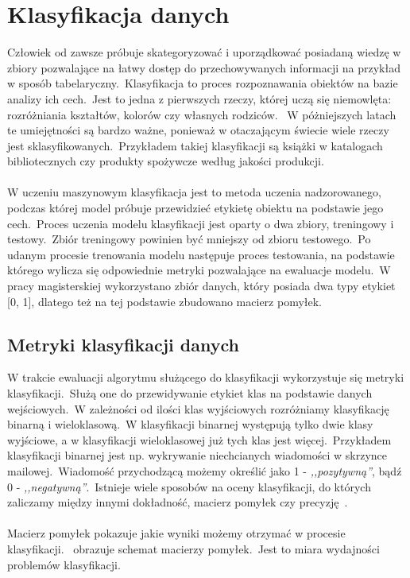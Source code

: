 \chapter{Klasyfikacja danych}

 Człowiek od zawsze próbuje skategoryzować i uporządkować posiadaną wiedzę w zbiory pozwalające na łatwy dostęp do przechowywanych informacji na przykład w sposób tabelaryczny.\ Klasyfikacja to proces rozpoznawania obiektów na bazie analizy ich cech.\ Jest to jedna z pierwszych rzeczy, której uczą się niemowlęta: rozróżniania kształtów, kolorów czy własnych rodziców. \ W póżniejszych latach te umiejętności są bardzo ważne, ponieważ w otaczającym świecie wiele rzeczy jest sklasyfikowanych.\ Przykładem takiej klasyfikacji są książki w katalogach bibliotecznych czy produkty spożywcze według jakości produkcji.
\\ \\
W uczeniu maszynowym klasyfikacja jest to metoda uczenia nadzorowanego, podczas której model próbuje przewidzieć etykietę obiektu na podstawie jego cech.\ Proces uczenia modelu klasyfikacji jest oparty o dwa zbiory, treningowy i testowy.\ Zbiór treningowy powinien być mniejszy od zbioru testowego.\ Po udanym procesie trenowania modelu następuje proces testowania, na podstawie którego wylicza się odpowiednie metryki pozwalające na ewaluacje modelu.\ W pracy magisterskiej wykorzystano zbiór danych, który posiada dwa typy etykiet [0, 1], dlatego też na tej podstawie zbudowano macierz pomyłek.

\section{Metryki klasyfikacji danych}
W trakcie ewaluacji algorytmu służącego do klasyfikacji wykorzystuje się metryki klasyfikacji.\ Służą one do przewidywanie etykiet klas na podstawie danych wejściowych.\ W zależności od ilości klas wyjściowych rozróżniamy klasyfikację binarną i wieloklasową.\ W klasyfikacji binarnej występują tylko dwie klasy wyjściowe, a w klasyfikacji wieloklasowej już tych klas jest więcej.\ Przykładem klasyfikacji binarnej jest np. wykrywanie niechcianych wiadomości w skrzynce mailowej.\ Wiadomość przychodzącą możemy określić jako 1 - \textit{,,pozytywną''}, bądź 0 - \textit{,,negatywną''}.\ Istnieje wiele sposobów na oceny klasyfikacji, do których zaliczamy między innymi dokładność, macierz pomyłek czy precyzję~\cite{Agrawal2024}.
\\ \\
Macierz pomyłek pokazuje jakie wyniki możemy otrzymać w procesie klasyfikacji.\  obrazuje schemat macierzy pomyłek.\ Jest to miara wydajności problemów klasyfikacji.

